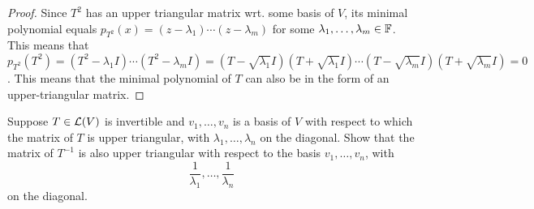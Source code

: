 \documentclass{extarticle}
\begin{document}
\begin{proof}
Since \(T^2\) has an upper triangular matrix wrt. some basis of \(V\), its minimal polynomial 
equals \(p_{T^2}(x) = (z - \lambda_1)\cdots(z - \lambda_m)\) for some \(\lambda_1, \ldots, \lambda_m \in \mathbb{F}\). 
This means that \(p_{T^2}(T^2) = (T^2 - \lambda_1 I) \cdots (T^2 - \lambda_m I) = (T - \sqrt{\lambda_1}I) 
(T + \sqrt{\lambda_1}I)\cdots(T - \sqrt{\lambda_m}I)(T + \sqrt{\lambda_m}I) = 0\). This means that the minimal polynomial 
of \(T\) can also be in the form of an upper-triangular matrix.  





\end{proof}

\begin{problem}{3}
    Suppose \(T \in \mathcal{L}(V)\) is invertible and \(v_1, \ldots, v_n\) is a basis of \(V\) with respect 
    to which the matrix of \(T\) is upper triangular, with \(\lambda_1, \ldots, \lambda_n\) on the 
    diagonal. Show that the matrix of \(T^{-1}\) is also upper triangular with respect to the basis 
    \(v_1, \ldots, v_n\), with 
    \[\frac{1}{\lambda_1}, \ldots, \frac{1}{\lambda_n}\]
    on the diagonal. 
\end{problem}
\end{document}

